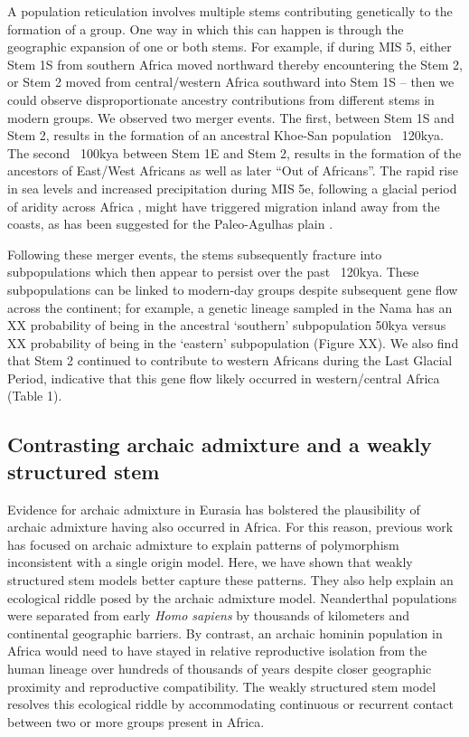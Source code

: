 \documentclass{article}
\begin{document}
A population reticulation involves multiple stems contributing genetically to
the formation of a group. One way in which this can happen is through the
geographic expansion of one or both stems. For example, if during MIS 5, either
Stem 1S from southern Africa moved northward thereby encountering the Stem 2,
or Stem 2 moved from central/western Africa southward into Stem 1S -- then we
could observe disproportionate ancestry contributions from different stems in
modern groups. We observed two merger events. The first, between Stem 1S and
Stem 2, results in the formation of an ancestral Khoe-San population ~120kya.
The second ~100kya between Stem 1E and Stem 2, results in the formation of the
ancestors of East/West Africans as well as later “Out of Africans”.  The rapid
rise in sea levels and increased precipitation during MIS 5e, following a
glacial period of aridity across Africa \citep{Blome2012-lw}, might have
triggered migration inland away from the coasts, as has been suggested for the
Paleo-Agulhas plain \citep{Marean2014-pg}. 

Following these merger events, the stems subsequently fracture into
subpopulations which then appear to persist over the past ~120kya. These
subpopulations can be linked to modern-day groups despite subsequent gene flow
across the continent; for example, a genetic lineage sampled in the Nama has an
XX probability of being in the ancestral ‘southern’ subpopulation 50kya versus
XX probability of being in the ‘eastern’ subpopulation (Figure XX). We also
find that Stem 2 continued to contribute to western Africans during the Last
Glacial Period, indicative that this gene flow likely occurred in
western/central Africa (Table 1). 

\subsection*{Contrasting archaic admixture and a weakly structured stem}

Evidence for archaic admixture in Eurasia has bolstered the plausibility of
archaic admixture having also occurred in Africa. For this reason, previous
work has focused on archaic admixture to explain patterns of polymorphism
inconsistent with a single origin model. Here, we have shown that weakly
structured stem models better capture these patterns. They also help explain an
ecological riddle posed by the archaic admixture model. Neanderthal populations
were separated from early \emph{Homo sapiens} by thousands of kilometers and
continental geographic barriers. By contrast, an archaic hominin population in
Africa would need to have stayed in relative reproductive isolation from the
human lineage over hundreds of thousands of years despite closer geographic
proximity and reproductive compatibility. The weakly structured stem model
resolves this ecological riddle by accommodating continuous or recurrent
contact between two or more groups present in Africa.
\end{document}
